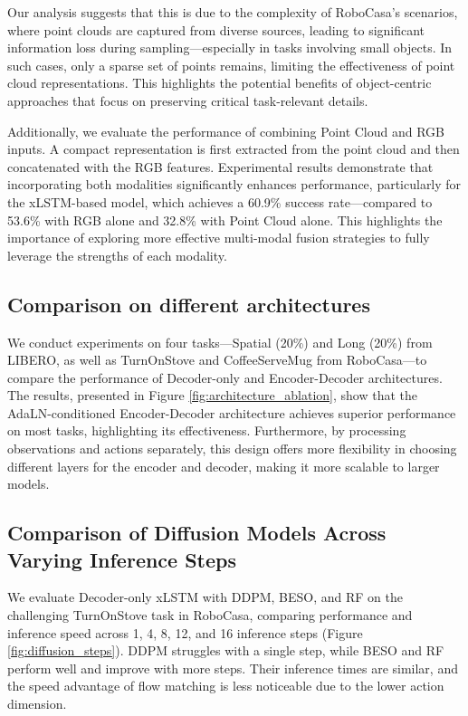 Our analysis suggests that this is due to the complexity of RoboCasa's scenarios, where point clouds are captured from diverse sources, leading to significant information loss during sampling—especially in tasks involving small objects. In such cases, only a sparse set of points remains, limiting the effectiveness of point cloud representations. This highlights the potential benefits of object-centric approaches that focus on preserving critical task-relevant details.

Additionally, we evaluate the performance of combining Point Cloud and RGB inputs. A compact representation is first extracted from the point cloud and then concatenated with the RGB features. Experimental results demonstrate that incorporating both modalities significantly enhances performance, particularly for the xLSTM-based model, which achieves a 60.9\% success rate—compared to 53.6\% with RGB alone and 32.8\% with Point Cloud alone. This highlights the importance of exploring more effective multi-modal fusion strategies to fully leverage the strengths of each modality.



\subsection{Comparison on different architectures}
We conduct experiments on four tasks—Spatial (20\%) and Long (20\%) from LIBERO, as well as TurnOnStove and CoffeeServeMug from RoboCasa—to compare the performance of Decoder-only and Encoder-Decoder architectures. The results, presented in Figure \ref{fig:architecture_ablation}, show that the AdaLN-conditioned Encoder-Decoder architecture achieves superior performance on most tasks, highlighting its effectiveness. Furthermore, by processing observations and actions separately, this design offers more flexibility in choosing different layers for the encoder and decoder, making it more scalable to larger models.

% 


% 
\subsection{Comparison of Diffusion Models Across Varying Inference Steps}
We evaluate Decoder-only xLSTM with DDPM, BESO, and RF on the challenging TurnOnStove task in RoboCasa, comparing performance and inference speed across 1, 4, 8, 12, and 16 inference steps (Figure \ref{fig:diffusion_steps}). DDPM struggles with a single step, while BESO and RF perform well and improve with more steps. Their inference times are similar, and the speed advantage of flow matching is less noticeable due to the lower action dimension.

